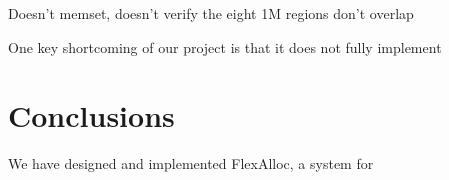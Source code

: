 Doesn't memset, doesn't verify the eight 1M regions don't overlap

One key shortcoming of our project is that it does not fully implement

\section{Conclusions}

We have designed and implemented FlexAlloc, a system for 








